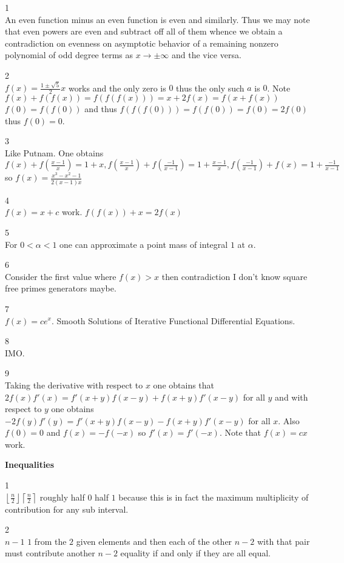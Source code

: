 1 \\
An even function minus an even function is even and similarly. Thus we may note that even powers are even and subtract off all of them whence we obtain a contradiction on evenness on asymptotic behavior of a remaining nonzero polynomial of odd degree terms as $x \to \pm \infty$ and the vice versa.

2 \\
$f(x)=\frac{1\pm\sqrt{5}}{2}x$ works and the only zero is $0$ thus the only such $a$ is $0$. Note $f(x)+f(f(x))=f(f(f(x)))=x+2f(x)=f(x+f(x))$ $f(0)=f(f(0))$ and thus $f(f(f(0)))=f(f(0))=f(0)=2f(0)$ thus $f(0)=0$.

3 \\
Like Putnam. One obtains $f(x)+f\left(\frac{x-1}{x}\right)=1+x,f\left(\frac{x-1}{x}\right)+f\left(\frac{-1}{x-1}\right)=1+\frac{x-1}{x},f\left(\frac{-1}{x-1}\right)+f(x)=1+\frac{-1}{x-1}$ so $\boxed{f(x)=\frac{x^3-x^2-1}{2(x-1)x}}$

4 \\
$\boxed{f(x)=x+c}$ work. $f(f(x))+x=2f(x)$

5 \\
For $0<\alpha<1$ one can approximate a point mass of integral $1$ at $\alpha$.

6 \\
Consider the first value where $f(x)>x$ then contradiction I don't know square free primes generators maybe.

7 \\
$\boxed{f(x)=ce^x}$. Smooth Solutions of Iterative Functional Differential Equations.

8 \\
IMO.

9 \\
Taking the derivative with respect to $x$ one obtains that $2f(x)f'(x)=f'(x+y)f(x-y)+f(x+y)f'(x-y)$ for all $y$ and with respect to $y$ one obtains $-2f(y)f'(y)=f'(x+y)f(x-y)-f(x+y)f'(x-y)$ for all $x$. Also $f(0)=0$ and $f(x)=-f(-x)$ so $f'(x)=f'(-x)$. Note that $f(x)=cx$ work.

\newpage

\textbf{Inequalities}

1 \\
$\boxed{\left \lfloor \frac{n}{2} \right \rfloor \left \lceil \frac{n}{2} \right \rceil}$ roughly half $0$ half $1$ because this is in fact the maximum multiplicity of contribution for any sub interval.

2 \\
$\boxed{n-1}$ $1$ from the $2$ given elements and then each of the other $n-2$ with that pair must contribute another $n-2$ equality if and only if they are all equal.


